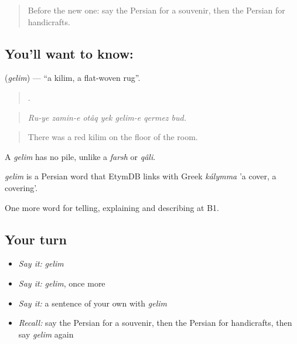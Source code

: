\label{lesson:FA-C463-gelim}



\begin{quote}
Before the new one: say the Persian for a souvenir, then the Persian for handicrafts.
\end{quote}

\subsection*{You'll want to know: }
\textbf{} (\emph{gelim}) — \textquotedblleft{}a kilim, a flat-woven rug\textquotedblright{}.

\begin{quote}
      .
\end{quote}

\begin{quote}
\emph{Ru-ye zamin-e otâq yek gelim-e qermez bud.}
\end{quote}

\begin{quote}
There was a red kilim on the floor of the room.
\end{quote}

A \emph{gelim} has no pile, unlike a \emph{farsh} or \emph{qâli}.

\begin{cousinweb}
\emph{gelim} is a Persian word that EtymDB links with Greek \emph{kálymma} 'a cover, a covering'.
\end{cousinweb}

\begin{grammarlens}[title={What you've built}]
One more word for telling, explaining and describing at B1.
\end{grammarlens}

\subsection*{Your turn}
\begin{itemize}
\raggedright
  \item \emph{Say it:} \emph{gelim}
  \item \emph{Say it:} \emph{gelim}, once more
  \item \emph{Say it:} a sentence of your own with \emph{gelim}
  \item \emph{Recall:} say the Persian for a souvenir, then the Persian for handicrafts, then say \emph{gelim} again
\end{itemize}

